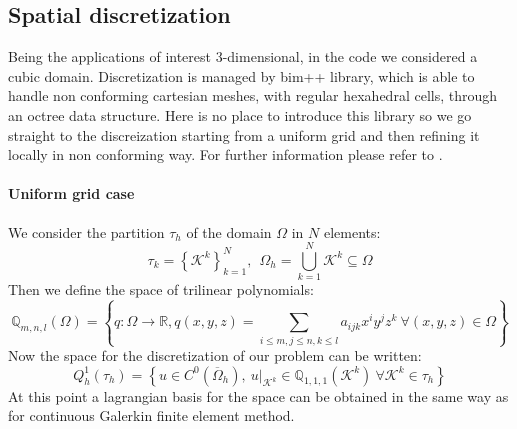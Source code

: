 \documentclass[11pt,a4paper]{article}
\begin{document}
\subsection{Spatial discretization}
Being the applications of interest 3-dimensional, in the code we considered a cubic domain. Discretization is managed by bim++ library, which is able to handle non conforming cartesian meshes, with regular hexahedral cells, through an octree data structure. Here is no place to introduce this library so we go straight to the discreization starting from a uniform grid and then refining it locally in non conforming way. For further information please refer to \cite{thesis-pasquale-africa}. 
\paragraph{Uniform grid case}
We consider the partition \(\tau_h\) of the domain \(\Omega\) in \(N\) elements:
\begin{equation}
	\tau_k=\left\{\mathcal{K}^k\right\}_{k=1}^N,\ \ \Omega_h=\bigcup_{k=1}^N \mathcal{K}^k \subseteq \Omega
\end{equation}
Then we define the space of trilinear polynomials:
\begin{equation}
	\mathbb{Q}_{m,n,l}(\Omega)=\left\{q:\Omega\rightarrow\mathbb{R}, q(x,y,z)=\sum_{i\leq m,j\leq n,k\leq l}a_{ijk}x^iy^jz^k\ \forall (x,y,z)\in\Omega \right\}
\end{equation}
Now the space for the discretization of our problem can be written:
\begin{equation}
	Q_h^1(\tau_h) = \left\{u\in C^0\left(\overline{\Omega}_h\right),\ u|_{\mathcal{K}^k}\in\mathbb{Q}_{1,1,1}\left(\mathcal{K}^k\right)\ \forall \mathcal{K}^k\in \tau_h \right\}
\end{equation}
At this point a lagrangian basis for the space can be obtained in the same way as for continuous Galerkin finite element method.
\end{document}
